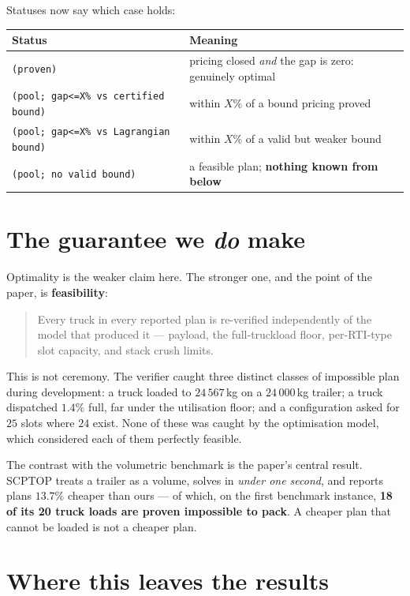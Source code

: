 \documentclass[11pt,a4paper]{article}
\begin{document}
Statuses now say which case holds:

\begin{center}\small
\begin{tabular}{@{}p{6.6cm}p{6.9cm}@{}}
\toprule
Status & Meaning \\
\midrule
\texttt{(proven)} & pricing closed \emph{and} the gap is zero: genuinely optimal \\
\texttt{(pool; gap<=X\% vs certified bound)} & within $X\%$ of a bound pricing proved \\
\texttt{(pool; gap<=X\% vs Lagrangian bound)} & within $X\%$ of a valid but weaker bound \\
\texttt{(pool; no valid bound)} & a feasible plan; \textbf{nothing known from below} \\
\bottomrule
\end{tabular}
\end{center}

\section{The guarantee we \emph{do} make}

Optimality is the weaker claim here. The stronger one, and the point of the
paper, is \textbf{feasibility}:

\begin{quote}
Every truck in every reported plan is re-verified independently of the model
that produced it --- payload, the full-truckload floor, per-RTI-type slot
capacity, and stack crush limits.
\end{quote}

This is not ceremony. The verifier caught three distinct classes of
impossible plan during development: a truck loaded to $24\,567$\,kg on a
$24\,000$\,kg trailer; a truck dispatched $1.4\%$ full, far under the
utilisation floor; and a configuration asked for $25$ slots where $24$ exist.
None of these was caught by the optimisation model, which considered each of
them perfectly feasible.

The contrast with the volumetric benchmark is the paper's central result. SCPTOP
treats a trailer as a volume, solves in \emph{under one second}, and reports
plans $13.7\%$ cheaper than ours --- of which, on the first benchmark instance,
\textbf{18 of its 20 truck loads are proven impossible to pack}. A cheaper plan
that cannot be loaded is not a cheaper plan.

\section{Where this leaves the results}
\end{document}
